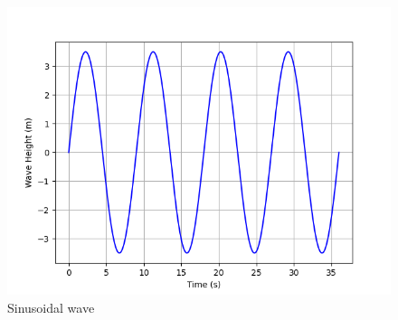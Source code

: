\documentclass[journal,12pt,onecolumn]{IEEEtran}
\theoremstyle{remark}
\begin{document}
\begin{figure}[h]
    \centering
    \includegraphics[width=\columnwidth]{figs/plot.png}
    \caption{Sinusoidal wave}
    \label{fig:}
\end{figure} 
\end{document}
